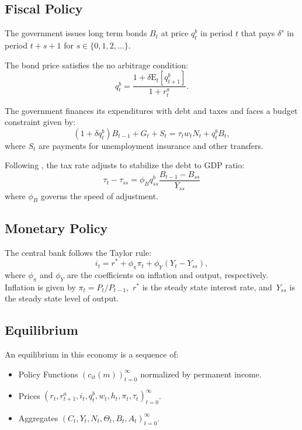 \documentclass[\econtexRoot/HAFiscal]{subfiles}
\begin{document}
\subsection{Fiscal Policy}

The government issues long term bonds $B_{t}$ at price $q^{b}_{t}$ in period $t$ that pays $\delta^{s}$ in period $t+s+1$ for $s \in \{0,1,2,\ldots\}$.

The bond price satisfies the no arbitrage condition:
$$q^{b}_{t} = \frac{ 1  + \delta \mathrm{E}_{t}[q^{b}_{t+1}]}{1+r^{a}_{t}}.$$ 

The government finances its expenditures with debt and taxes and faces a budget constraint given by: 
$$ (1 + \delta q^{b}_{t})B_{t-1} + G_{t}  + S_{t} = \tau_{t} w_{t} N_{t}+ q^{b}_{t}B_{t},$$
where $S_{t}$ are payments for unemployment insurance and other transfers.

Following \cite{Auclert2020}, the tax rate adjusts to stabilize the debt to GDP ratio:
$$\tau_{t} - \tau_{ss} = \phi_{B} q^{b}_{ss} \frac{B_{t-1} - B_{ss} }{Y_{ss}}$$
where $\phi_{B}$ governs the speed of adjustment. 

\subsection{Monetary Policy}

The central bank follows the Taylor rule: 
$$i_{t} = r^{*} +\phi_{\pi} \pi_{t}  + \phi_{Y} (Y_{t} -  Y_{ss}),$$ 
where $\phi_{\pi}$ and $\phi_{Y} $ are the coefficients on inflation and output, respectively. Inflation is given by $\pi_t = P_t/P_{t-1}$,~$r^{*}$ is the steady state interest rate, and~$Y_{ss}$ is the steady state level of output. 

\subsection{Equilibrium}

An equilibrium in this economy is a sequence of: 
\begin{itemize}[label=--]
	\item Policy Functions $\left( c_{it}(m) \right )_{t=0}^{\infty}$ normalized by permanent income.
	\item Prices $ \left(r_{t},  r^{a}_{t+1}, i_{t}, q^{b}_{t},  w_{t}, h_{t} , \pi_{t} , \tau_{t} \right) _{t=0}^{\infty}$.
	\item Aggregates $ \left(C_{t}, Y_{t} , N_{t},   \Theta_{t},  B_{t} , A_{t}  \right)_{t=0}^{\infty}$.
\end{itemize}
\end{document}
